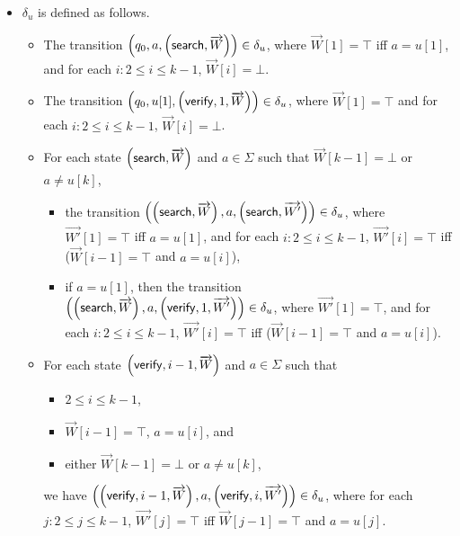 \begin{definition}
\begin{itemize}
	\item $\delta_{u}$ is defined as follows.
	\begin{itemize}
		\item The transition $\left(q_0, a, \left(\mathsf{search}, \overrightarrow{W}\right)\right) \in \delta_u$, where $\overrightarrow{W}[1]=\top$ iff $a = u[1]$, and for each $i: 2 \le i \le k-1$, $\overrightarrow{W}[i] = \bot$.
		\item The transition $\left(q_0, u[1], \left(\mathsf{verify}, 1, \overrightarrow{W}\right)\right) \in \delta_u$, where $\overrightarrow{W}[1]=\top$ and for each $i: 2 \le i \le k-1$, $\overrightarrow{W}[i] = \bot$.
%
		\item For each state $\left(\mathsf{search}, \overrightarrow{W} \right)$ and $a \in \Sigma$ such that $\overrightarrow{W}[k-1] = \bot$ or $a \neq u[k]$,
		\begin{itemize}
			\item the transition $\left(\left(\mathsf{search}, \overrightarrow{W} \right), a, \left(\mathsf{search}, \overrightarrow{W'} \right)\right) \in \delta_u$, where $\overrightarrow{W'}[1] = \top$ iff $a = u[1]$, and for each $i: 2 \le i \le k-1$, $\overrightarrow{W'}[i] =\top$ iff ($\overrightarrow{W}[{i-1}] = \top$ and $a = u[i]$),
			\item if $a = u[1]$, then the transition $\left(\left(\mathsf{search}, \overrightarrow{W} \right), a, \left(\mathsf{verify}, 1, \overrightarrow{W'} \right)\right) \in \delta_u$, where $\overrightarrow{W'}[1]=\top$,  and for each $i: 2 \le i \le k-1$, $\overrightarrow{W'}[i] =\top$ iff ($\overrightarrow{W}[{i-1}] = \top$ and $a = u[i]$).
		\end{itemize}
		\item For each state $\left(\mathsf{verify}, i-1, \overrightarrow{W} \right)$ and $a \in \Sigma$ such that
		\begin{itemize}
			\item $2 \le i \le k-1$,
			\item $\overrightarrow{W}[i-1]=\top$, $a = u[i]$, and
			\item either $\overrightarrow{W}[k-1]=\bot$ or $a \neq u[k]$,
		\end{itemize}
		we have $\left(\left(\mathsf{verify}, i-1, \overrightarrow{W} \right), a, \left(\mathsf{verify}, i, \overrightarrow{W'} \right)\right) \in \delta_u$, where for each $j: 2 \le j \le k-1$, $\overrightarrow{W'}[j] = \top$ iff $\overrightarrow{W}[j-1]=\top$ and $a = u[j]$.

\end{itemize}
\end{itemize}
\end{definition}
